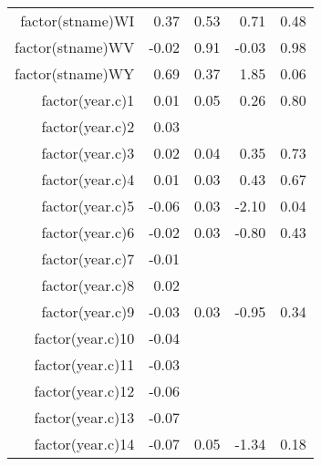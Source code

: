 \begin{table}[ht]
\begin{tabular}{rrrrr}
  factor(stname)WI & 0.37 & 0.53 & 0.71 & 0.48 \\ 
  factor(stname)WV & -0.02 & 0.91 & -0.03 & 0.98 \\ 
  factor(stname)WY & 0.69 & 0.37 & 1.85 & 0.06 \\ 
  factor(year.c)1 & 0.01 & 0.05 & 0.26 & 0.80 \\ 
  factor(year.c)2 & 0.03 &  &  &  \\ 
  factor(year.c)3 & 0.02 & 0.04 & 0.35 & 0.73 \\ 
  factor(year.c)4 & 0.01 & 0.03 & 0.43 & 0.67 \\ 
  factor(year.c)5 & -0.06 & 0.03 & -2.10 & 0.04 \\ 
  factor(year.c)6 & -0.02 & 0.03 & -0.80 & 0.43 \\ 
  factor(year.c)7 & -0.01 &  &  &  \\ 
  factor(year.c)8 & 0.02 &  &  &  \\ 
  factor(year.c)9 & -0.03 & 0.03 & -0.95 & 0.34 \\ 
  factor(year.c)10 & -0.04 &  &  &  \\ 
  factor(year.c)11 & -0.03 &  &  &  \\ 
  factor(year.c)12 & -0.06 &  &  &  \\ 
  factor(year.c)13 & -0.07 &  &  &  \\ 
  factor(year.c)14 & -0.07 & 0.05 & -1.34 & 0.18 \\ 
   \hline
\end{tabular}
\end{table}
